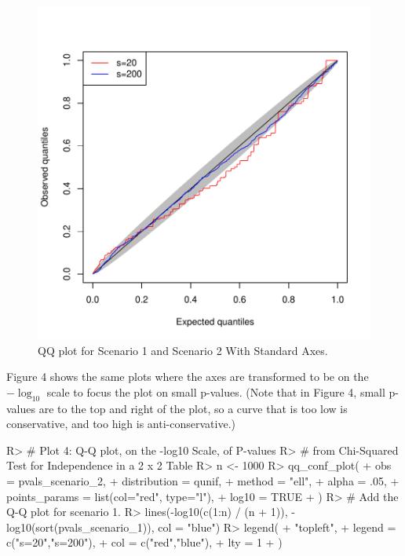 \documentclass[article]{jss}
\begin{document}
\begin{figure}
\begin{center}
\includegraphics{manuscript-chisq_qq}
\end{center}
\caption{QQ plot for Scenario 1 and Scenario 2 With Standard Axes.}
\end{figure}

Figure 4 shows the same plots where the axes are transformed to be on the $-\log_{10}$ scale to focus the plot on small p-values. (Note that in Figure 4, small p-values are to the top and right of the plot, so a curve that is too low is conservative, and too high is anti-conservative.)  

\begin{Schunk}
\begin{Sinput}
R> # Plot 4: Q-Q plot, on the -log10 Scale, of P-values 
R> # from Chi-Squared Test for Independence in a 2 x 2 Table
R> n <- 1000
R> qq_conf_plot(
+    obs = pvals_scenario_2,
+    distribution = qunif,
+    method = "ell",
+    alpha = .05,
+    points_params = list(col="red", type="l"),
+    log10 = TRUE
+  )
R> # Add the Q-Q plot for scenario 1.
R> lines(-log10(c(1:n) / (n + 1)), -log10(sort(pvals_scenario_1)), col = "blue")
R> legend(
+    "topleft",
+    legend = c("s=20","s=200"), 
+    col = c("red","blue"), 
+    lty = 1
+  )
\end{Sinput}
\end{Schunk}
\end{document}
